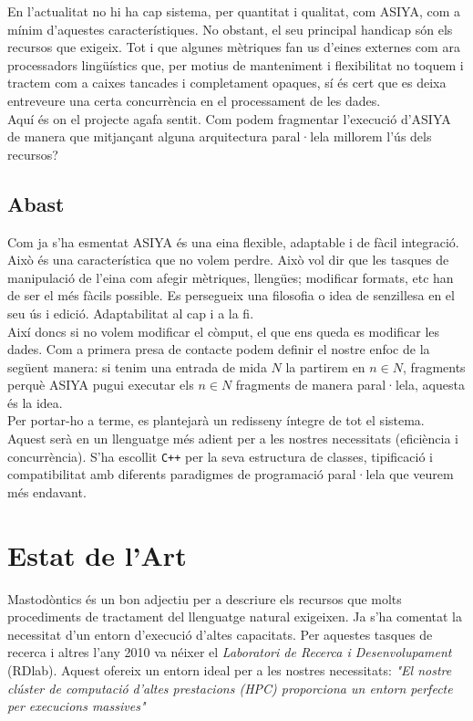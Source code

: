 \documentclass[11pt,a4paper]{article}
\begin{document}
En l'actualitat no hi ha cap sistema, per quantitat i qualitat, com ASIYA, com a mínim d'aquestes característiques. No obstant, el seu principal handicap són els recursos que exigeix. Tot i que algunes mètriques fan us d'eines externes com ara processadors lingüístics que, per motius de manteniment i flexibilitat no toquem i tractem com a caixes tancades i completament opaques, sí és cert que es deixa entreveure una certa concurrència en el processament de les dades. 
\\

Aquí és on el projecte agafa sentit. Com podem fragmentar l'execució d'ASIYA de manera que mitjançant alguna arquitectura paral·lela millorem l'ús dels recursos?
\\

\subsection{Abast}
Com ja s'ha esmentat ASIYA és una eina flexible, adaptable i de fàcil integració. Això és una característica que no volem perdre.  Això vol dir que les tasques de manipulació de l'eina com afegir mètriques, llengües; modificar formats, etc han de ser el més fàcils possible. Es persegueix una filosofia o idea de senzillesa en el seu ús i edició. Adaptabilitat al cap i a la fi.
\\

Així doncs si no volem modificar el còmput, el que ens queda es modificar les dades. Com a primera presa de contacte podem definir el nostre enfoc de la següent manera: si tenim una entrada de mida $N$ la partirem en $n \in N$, fragments perquè ASIYA pugui executar els $n \in N$ fragments de manera paral·lela, aquesta és la idea.
\\

Per portar-ho a terme, es plantejarà un redisseny íntegre de tot el sistema. Aquest serà en un llenguatge més adient per a les nostres necessitats (eficiència i concurrència). S'ha escollit \texttt{C++} per la seva estructura de classes, tipificació i compatibilitat amb diferents paradigmes de programació paral·lela que veurem més endavant.

\newpage
\section{Estat de l'Art}
Mastodòntics és un bon adjectiu per a descriure els recursos que molts procediments de tractament del llenguatge natural exigeixen. Ja s'ha comentat la necessitat d'un entorn d'execució d'altes capacitats. Per aquestes tasques de recerca i altres l'any 2010 va néixer el \textit{Laboratori de Recerca i Desenvolupament} (RDlab). Aquest ofereix un entorn ideal per a les nostres necessitats: \textit{"El nostre clúster de computació d’altes prestacions (HPC) proporciona un entorn perfecte per execucions massives"}\cite{cluster}
\\
\end{document}
